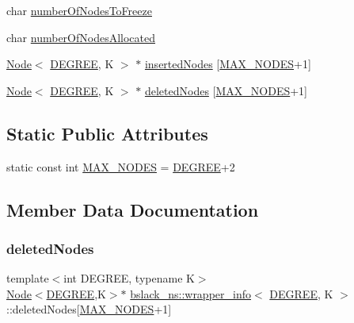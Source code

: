\begin{DoxyCompactItemize}
\item 
char \hyperlink{classbslack__ns_1_1wrapper__info_ae638a51d89fc70f4924c21ffb5957f77}{number\+Of\+Nodes\+To\+Freeze}
\item 
char \hyperlink{classbslack__ns_1_1wrapper__info_a6daa6974ed40c90ff51a76d0ae155d1e}{number\+Of\+Nodes\+Allocated}
\item 
\hyperlink{structbslack__ns_1_1Node}{Node}$<$ \hyperlink{brown__sigouin__abtree__kcas_2adapter_8h_a5d88b17d70c985f2f2b8e987037fd6dd}{D\+E\+G\+R\+EE}, K $>$ $\ast$ \hyperlink{classbslack__ns_1_1wrapper__info_a17f79b301b37cc9167592860998a8aa8}{inserted\+Nodes} \mbox{[}\hyperlink{classbslack__ns_1_1wrapper__info_ab5bcd31a5ba96938aa04b6e43da441c4}{M\+A\+X\+\_\+\+N\+O\+D\+ES}+1\mbox{]}
\item 
\hyperlink{structbslack__ns_1_1Node}{Node}$<$ \hyperlink{brown__sigouin__abtree__kcas_2adapter_8h_a5d88b17d70c985f2f2b8e987037fd6dd}{D\+E\+G\+R\+EE}, K $>$ $\ast$ \hyperlink{classbslack__ns_1_1wrapper__info_a4d438c20f50d6020d2eefa186047e6c3}{deleted\+Nodes} \mbox{[}\hyperlink{classbslack__ns_1_1wrapper__info_ab5bcd31a5ba96938aa04b6e43da441c4}{M\+A\+X\+\_\+\+N\+O\+D\+ES}+1\mbox{]}
\end{DoxyCompactItemize}
\subsection*{Static Public Attributes}
\begin{DoxyCompactItemize}
\item 
static const int \hyperlink{classbslack__ns_1_1wrapper__info_ab5bcd31a5ba96938aa04b6e43da441c4}{M\+A\+X\+\_\+\+N\+O\+D\+ES} = \hyperlink{brown__sigouin__abtree__kcas_2adapter_8h_a5d88b17d70c985f2f2b8e987037fd6dd}{D\+E\+G\+R\+EE}+2
\end{DoxyCompactItemize}


\subsection{Member Data Documentation}
\mbox{\label{classbslack__ns_1_1wrapper__info_a4d438c20f50d6020d2eefa186047e6c3}} 
\subsubsection{\texorpdfstring{deleted\+Nodes}{deletedNodes}}
{\footnotesize\ttfamily template$<$int D\+E\+G\+R\+EE, typename K$>$ \\
\hyperlink{structbslack__ns_1_1Node}{Node}$<$\hyperlink{brown__sigouin__abtree__kcas_2adapter_8h_a5d88b17d70c985f2f2b8e987037fd6dd}{D\+E\+G\+R\+EE},K$>$$\ast$ \hyperlink{classbslack__ns_1_1wrapper__info}{bslack\+\_\+ns\+::wrapper\+\_\+info}$<$ \hyperlink{brown__sigouin__abtree__kcas_2adapter_8h_a5d88b17d70c985f2f2b8e987037fd6dd}{D\+E\+G\+R\+EE}, K $>$\+::deleted\+Nodes\mbox{[}\hyperlink{classbslack__ns_1_1wrapper__info_ab5bcd31a5ba96938aa04b6e43da441c4}{M\+A\+X\+\_\+\+N\+O\+D\+ES}+1\mbox{]}}

